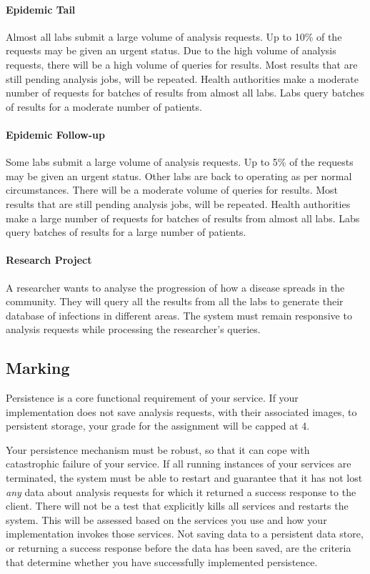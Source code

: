 \documentclass{csse4400}
\begin{document}
\paragraph{Epidemic Tail}
Almost all labs submit a large volume of analysis requests.
Up to 10\% of the requests may be given an urgent status.
Due to the high volume of analysis requests, there will be a high volume of queries for results.
Most results that are still pending analysis jobs, will be repeated.
Health authorities make a moderate number of requests for batches of results from almost all labs.
Labs query batches of results for a moderate number of patients.

\paragraph{Epidemic Follow-up}
Some labs submit a large volume of analysis requests.
Up to 5\% of the requests may be given an urgent status.
Other labs are back to operating as per normal circumstances.
There will be a moderate volume of queries for results.
Most results that are still pending analysis jobs, will be repeated.
Health authorities make a large number of requests for batches of results from almost all labs.
Labs query batches of results for a large number of patients.

\paragraph{Research Project}
A researcher wants to analyse the progression of how a disease spreads in the community.
They will query all the results from all the labs to generate their database of infections in different areas.
The system must remain responsive to analysis requests while processing the researcher's queries.

\subsection{Marking}
Persistence is a core functional requirement of your service.
If your implementation does not save analysis requests, with their associated images,
to persistent storage, your grade for the assignment will be capped at 4.

Your persistence mechanism must be robust, so that it can cope with catastrophic failure of your service.
If all running instances of your services are terminated,
the system must be able to restart and guarantee that it has not lost \textit{any} data
about analysis requests for which it returned a success response to the client.
There will not be a test that explicitly kills all services and restarts the system.
This will be assessed based on the services you use and how your implementation invokes those services.
Not saving data to a persistent data store, or returning a success response before the data has been saved,
are the criteria that determine whether you have successfully implemented persistence.
\end{document}
